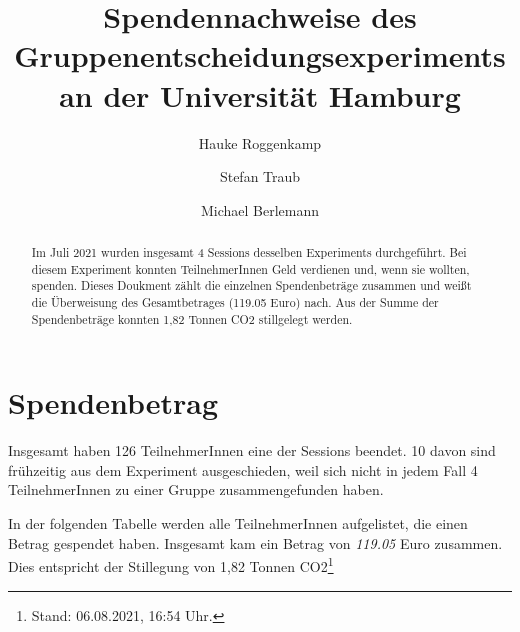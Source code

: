 \documentclass[]{elsarticle} %
\begin{document}
\begin{frontmatter}

  \title{Spendennachweise des Gruppenentscheidungsexperiments an der
Universität Hamburg}
    \author[Helmut-Schmidt-Universität]{Hauke Roggenkamp%
  }
    \author[Helmut-Schmidt-Universität]{Stefan Traub}
  
    \author[Helmut-Schmidt-Universität]{Michael Berlemann}
  
  
  \begin{abstract}
  Im Juli 2021 wurden insgesamt 4 Sessions desselben Experiments
  durchgeführt. Bei diesem Experiment konnten TeilnehmerInnen Geld
  verdienen und, wenn sie wollten, spenden. Dieses Doukment zählt die
  einzelnen Spendenbeträge zusammen und weißt die Überweisung des
  Gesamtbetrages (119.05 Euro) nach. Aus der Summe der Spendenbeträge
  konnten 1,82 Tonnen CO2 stillgelegt werden.
  \end{abstract}
  
 \end{frontmatter}

\hypertarget{spendenbetrag}{%
\section{Spendenbetrag}\label{spendenbetrag}}

Insgesamt haben 126 TeilnehmerInnen eine der Sessions beendet. 10 davon
sind frühzeitig aus dem Experiment ausgeschieden, weil sich nicht in
jedem Fall 4 TeilnehmerInnen zu einer Gruppe zusammengefunden haben.

In der folgenden Tabelle werden alle TeilnehmerInnen aufgelistet, die
einen Betrag gespendet haben. Insgesamt kam ein Betrag von \emph{119.05}
Euro zusammen. Dies entspricht der Stillegung von 1,82 Tonnen
CO2\footnote{Stand: 06.08.2021, 16:54 Uhr.}

\begingroup\fontsize{7}{9}\selectfont
\end{document}
